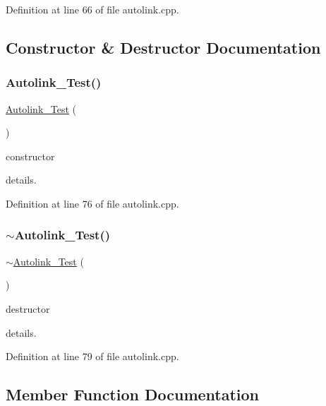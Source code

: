 Definition at line 66 of file autolink.\+cpp.



\subsection{Constructor \& Destructor Documentation}
\mbox{\label{class_autolink___test_a4d8de7614847eca2cbaad61f4a8f0f15}} 
\subsubsection{\texorpdfstring{Autolink\+\_\+\+Test()}{Autolink\_Test()}}
{\footnotesize\ttfamily \hyperlink{class_autolink___test}{Autolink\+\_\+\+Test} (\begin{DoxyParamCaption}{ }\end{DoxyParamCaption})}



constructor 

details. 

Definition at line 76 of file autolink.\+cpp.

\mbox{\label{class_autolink___test_a53069f9df63c2d47097eb12ea14796f5}} 
\subsubsection{\texorpdfstring{$\sim$\+Autolink\+\_\+\+Test()}{~Autolink\_Test()}}
{\footnotesize\ttfamily $\sim$\hyperlink{class_autolink___test}{Autolink\+\_\+\+Test} (\begin{DoxyParamCaption}{ }\end{DoxyParamCaption})}



destructor 

details. 

Definition at line 79 of file autolink.\+cpp.



\subsection{Member Function Documentation}
\mbox{\label{class_autolink___test_a3b57d2ff9a1488b8e434478eb77e7846}} 
